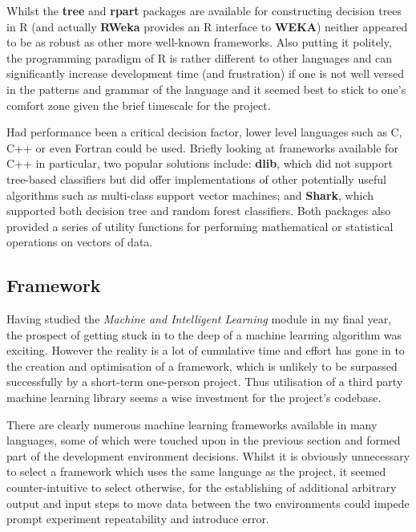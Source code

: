 Whilst the \textbf{tree}\citep{man:rtree} and \textbf{rpart}\citep{man:rpart}
packages are available for constructing decision trees in R (and actually
\textbf{RWeka} provides an R interface to \textbf{WEKA}) neither appeared to be
as robust as other more well-known frameworks. Also putting it politely, the
programming paradigm of R\citep{man:R} is rather different to other languages
and can significantly increase development time (and frustration\citep{argh}) if
one is not well versed in the patterns and grammar of the language  and it
seemed best to stick to one's comfort zone given the brief timescale for the
project.

Had performance been a critical decision factor, lower level languages such as
C, C++ or even Fortran could be used. Briefly looking at frameworks available
for C++ in particular, two popular solutions include: \textbf{dlib}\citep{dlib},
which did not support tree-based classifiers but did offer implementations of
other potentially useful algorithms such as multi-class support vector machines;
and \textbf{Shark}\citep{shark}, which supported both decision tree and random
forest classifiers. Both packages also provided a series of utility functions
for performing mathematical or statistical operations on vectors of data.


\subsection{Framework}

Having studied the \textit{Machine and Intelligent Learning} module in my final
year, the prospect of getting stuck in to the deep of a machine learning
algorithm was exciting. However the reality is a lot of cumulative time and
effort has gone in to the creation and optimisation of a framework, which is
unlikely to be surpassed successfully by a short-term one-person project. Thus
utilisation of a third party machine learning library seems a wise investment
for the project's codebase.

There are clearly numerous machine learning frameworks available in many
languages, some of which were touched upon in the previous section and formed
part of the development environment decisions.
Whilst it is obviously unnecessary to select a framework which uses
the same language as the project, it seemed counter-intuitive to select otherwise,
for the establishing of additional arbitrary output and input steps to move data
between the two environments could impede prompt experiment repeatability and
introduce error.

